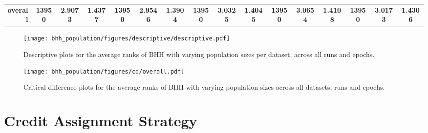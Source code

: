 \begin{table}[htbp]
{\begin{tabular}{rccccccccccccccc}
			\midrule
			\textbf{overall}                    & \textbf{13950}                          & \cellcolor[rgb]{ .776,  .937,  .808}\textcolor[rgb]{ 0,  .38,  0}{\textbf{2.9073}} & \textbf{1.4377} & \textbf{13950}                  & \textbf{2.9546}                                                           & \textbf{1.3904} & \textbf{13950}                  & \textbf{3.0325} & \textbf{1.4045} & \textbf{13950}                  & \textbf{3.0654}                                                           & \textbf{1.4108} & \textbf{13950}                  & \textbf{3.0173}                                                           & \textbf{1.4306} \\
		\end{tabular}%
	}
\end{table}%

\begin{figure}[htbp]
	\centering
	\texttt{[image: bhh\_population/figures/descriptive/descriptive.pdf]}
	\caption{Descriptive plots for the average ranks of \acs{BHH} with varying population sizes per dataset, across all runs and epochs.}
	\label{fig:results:population:descriptive:descriptive}
\end{figure}

\begin{figure}[htbp]
	\centering
	\texttt{[image: bhh\_population/figures/cd/overall.pdf]}
	\caption{Critical difference plots for the average ranks of \acs{BHH} with varying population sizes across all datasets, runs and epochs.}
	\label{fig:results:population:descriptive:cd}
\end{figure}

\section{Credit Assignment Strategy}\label{sec:results:bhh_variant_credit}

